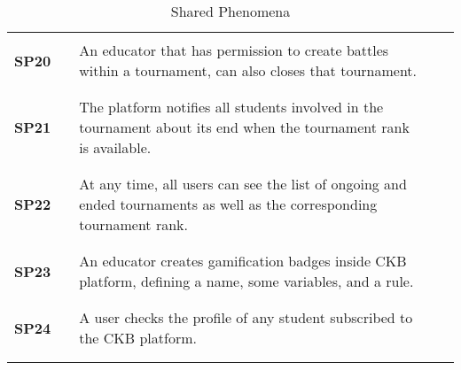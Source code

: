\begin{longtable}[H]{l l p{8.5cm} l l}
                   &        &                                                                                                                                   &        &                        \\\hline & & \\
    \textbf{SP20}  & \vline & An educator that has permission to create battles within a tournament, can also closes that tournament.                           & \vline &                        \\
                   &        &                                                                                                                                   &        &                        \\\hline & & \\
    \textbf{SP21}  & \vline & The platform notifies all students involved in the tournament about its end when the tournament rank is available.                & \vline &                        \\
                   &        &                                                                                                                                   &        &                        \\\hline & & \\
    \textbf{SP22}  & \vline & At any time, all users can see the list of ongoing and ended tournaments as well as the corresponding tournament rank.            & \vline &                        \\
                   &        &                                                                                                                                   &        &                        \\\hline & & \\
    \textbf{SP23}  & \vline & An educator creates gamification badges inside CKB platform, defining a name, some variables, and a rule.                         & \vline &                        \\
                   &        &                                                                                                                                   &        &                        \\\hline & & \\
    \textbf{SP24}  & \vline & A user checks the profile of any student subscribed to the CKB platform.                                                          & \vline &                        \\
                   &        &                                                                                                                                   &        &                        \\
    \hline                                                   
    \caption{Shared Phenomena}
\end{longtable}

